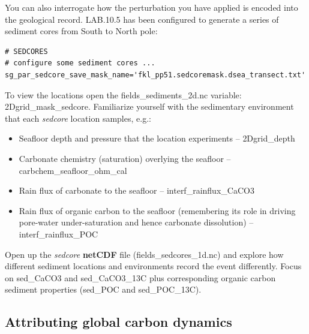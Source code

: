 \noindent You can also interrogate how the perturbation you have applied is encoded into the geological record. \textsf{\footnotesize LAB.10.5} has been configured to generate a series of sediment cores from South to North pole:
\vspace{-1mm}\small\begin{verbatim}
# SEDCORES
# configure some sediment cores ... 
sg_par_sedcore_save_mask_name='fkl_pp51.sedcoremask.dsea_transect.txt'
\end{verbatim}\normalsize\vspace{-1mm}

\noindent To view the locations open the \textsf{\footnotesize fields\_sediments\_2d.nc} variable: \textsf{\footnotesize 2Dgrid\_mask\_sedcore}. Familiarize yourself with the sedimentary environment that each \textit{sedcore} location samples, e.g.:

\vspace{1mm}
\begin{itemize}[noitemsep]
\item Seafloor depth and pressure that the location experiments -- \textsf{\footnotesize 2Dgrid\_depth}
\item Carbonate chemistry (saturation) overlying the seafloor -- \textsf{\footnotesize carbchem\_seafloor\_ohm\_cal}
\item Rain flux of carbonate to the seafloor -- \textsf{\footnotesize interf\_rainflux\_CaCO3}
\item Rain flux of organic carbon to the seafloor (remembering its role in driving pore-water under-saturation and hence carbonate dissolution) -- \textsf{\footnotesize interf\_rainflux\_POC}
\end{itemize}

\vspace{1mm}
\noindent Open up the \textit{sedcore} \textbf{netCDF} file (\textsf{\footnotesize fields\_sedcores\_1d.nc}) and explore how different sediment locations and environments record the event differently. Focus on \textsf{\footnotesize sed\_CaCO3} and \textsf{\footnotesize sed\_CaCO3\_13C} plus corresponding organic carbon sediment properties (\textsf{\footnotesize sed\_POC} and \textsf{\footnotesize sed\_POC\_13C}).

\newpage

\subsection{Attributing global carbon dynamics}

